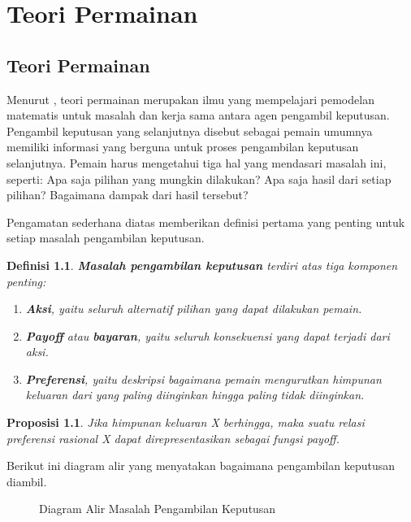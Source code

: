 \newtheorem{definisi}{Definisi}
\newtheorem{proposisi}{Proposisi}
\newtheorem{aksioma}{Aksioma}
\chapter{Teori Permainan}
\section{Teori Permainan}
Menurut \textcite{tadelis2013game}, teori permainan merupakan ilmu yang mempelajari pemodelan matematis untuk masalah dan kerja sama antara agen pengambil keputusan. Pengambil keputusan yang selanjutnya disebut sebagai pemain umumnya memiliki informasi yang berguna untuk proses pengambilan keputusan selanjutnya. Pemain harus mengetahui tiga hal yang mendasari masalah ini, seperti: Apa saja pilihan yang mungkin dilakukan? Apa saja hasil dari setiap pilihan? Bagaimana dampak dari hasil tersebut?

Pengamatan sederhana diatas memberikan definisi pertama yang penting untuk setiap masalah pengambilan keputusan.
\begin{definisi}
    \textbf{Masalah pengambilan keputusan} terdiri atas tiga komponen penting:
    \begin{enumerate}
        \item \textbf{Aksi}, yaitu seluruh alternatif pilihan yang dapat dilakukan pemain.
        \item \textbf{Payoff} atau \textbf{bayaran}, yaitu seluruh konsekuensi yang dapat terjadi dari aksi.
        \item \textbf{Preferensi}, yaitu deskripsi bagaimana pemain mengurutkan himpunan keluaran dari yang paling diinginkan hingga paling tidak diinginkan.
    \end{enumerate}
\end{definisi}

\begin{proposisi}
    Jika himpunan keluaran X berhingga, maka suatu relasi preferensi rasional X dapat direpresentasikan sebagai fungsi payoff.
\end{proposisi}

Berikut ini diagram alir yang menyatakan bagaimana pengambilan keputusan diambil.
\pagebreak
\begin{figure}
    \centering
    
    \caption{Diagram Alir Masalah Pengambilan Keputusan}
\end{figure}

